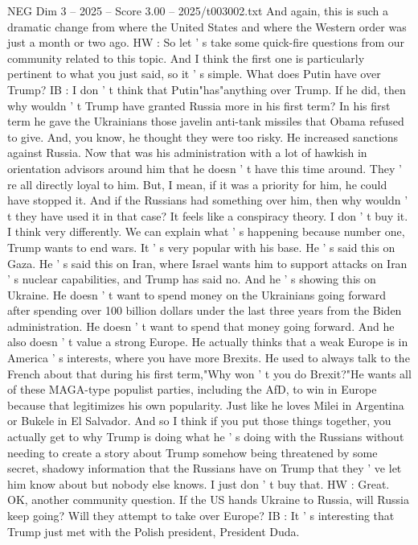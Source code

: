 \begin{textsample}{NEG Dim 3 – 2025 – Score 3.00 – 2025/t003002.txt}
And again, this is such a dramatic change from where the United States and where the Western order was just a month or two ago.
HW : So let ' s take some quick-fire questions from our community related to this topic.
And I think the first one is particularly pertinent to what you just said, so it ' s simple.
What does Putin have over Trump?
IB : I don ' t think that Putin"has"anything over Trump.
If he did, then why wouldn ' t Trump have granted Russia more in his first term?
In his first term he gave the Ukrainians those javelin anti-tank missiles that Obama refused to give.
And, you know, he thought they were too risky.
He increased sanctions against Russia.
Now that was his administration with a lot of hawkish in orientation advisors around him that he doesn ' t have this time around.
They ' re all directly loyal to him.
But, I mean, if it was a priority for him, he could have stopped it.
And if the Russians had something over him, then why wouldn ' t they have used it in that case?
It feels like a conspiracy theory.
I don ' t buy it.
I think very differently.
We can explain what ' s happening because number one, Trump wants to end wars.
It ' s very popular with his base.
He ' s said this on Gaza.
He ' s said this on Iran, where Israel wants him to support attacks on Iran ' s nuclear capabilities, and Trump has said no.
And he ' s showing this on Ukraine.
He doesn ' t want to spend money on the Ukrainians going forward after spending over 100 billion dollars under the last three years from the Biden administration.
He doesn ' t want to spend that money going forward.
And he also doesn ' t value a strong Europe.
He actually thinks that a weak Europe is in America ' s interests, where you have more Brexits.
He used to always talk to the French about that during his first term,"Why won ' t you do Brexit?"He wants all of these MAGA-type populist parties, including the AfD, to win in Europe because that legitimizes his own popularity.
Just like he loves Milei in Argentina or Bukele in El Salvador.
And so I think if you put those things together, you actually get to why Trump is doing what he ' s doing with the Russians without needing to create a story about Trump somehow being threatened by some secret, shadowy information that the Russians have on Trump that they ' ve let him know about but nobody else knows.
I just don ' t buy that.
HW : Great.
OK, another community question.
If the US hands Ukraine to Russia, will Russia keep going?
Will they attempt to take over Europe?
IB : It ' s interesting that Trump just met with the Polish president, President Duda.

\end{textsample}
